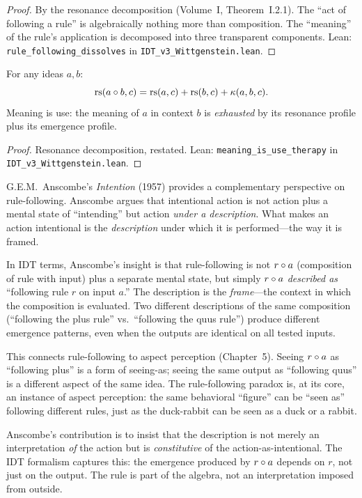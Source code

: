 \begin{proof}
By the resonance decomposition (Volume~I, Theorem~I.2.1). The ``act of
following a rule'' is algebraically nothing more than composition. The
``meaning'' of the rule's application is decomposed into three transparent
components.
Lean: \texttt{rule\_following\_dissolves} in \texttt{IDT\_v3\_Wittgenstein.lean}.
\end{proof}

\begin{theorem}
\label{thm:meaning-use-therapy}
For any ideas $a, b$:
\[
\mathrm{rs}(a \circ b, c) = \mathrm{rs}(a, c) + \mathrm{rs}(b, c) + \kappa(a, b, c).
\]
Meaning is use: the meaning of $a$ in context $b$ is \emph{exhausted} by
its resonance profile plus its emergence profile.
\end{theorem}

\begin{proof}
Resonance decomposition, restated.
Lean: \texttt{meaning\_is\_use\_therapy} in \texttt{IDT\_v3\_Wittgenstein.lean}.
\end{proof}

\begin{interpretation}
G.E.M.~Anscombe's \textit{Intention} (1957) provides a complementary
perspective on rule-following. Anscombe argues that intentional action is
not action plus a mental state of ``intending'' but action \emph{under a
description}. What makes an action intentional is the \emph{description}
under which it is performed---the way it is framed.

In IDT terms, Anscombe's insight is that rule-following is not
$r \circ a$ (composition of rule with input) plus a separate mental
state, but simply $r \circ a$ \emph{described as} ``following rule $r$
on input $a$.'' The description is the \emph{frame}---the context in which
the composition is evaluated. Two different descriptions of the same
composition (``following the plus rule'' vs.\ ``following the quus rule'')
produce different emergence patterns, even when the outputs are identical
on all tested inputs.

This connects rule-following to aspect perception (Chapter~5). Seeing
$r \circ a$ as ``following plus'' is a form of seeing-as; seeing the
same output as ``following quus'' is a different aspect of the same idea.
The rule-following paradox is, at its core, an instance of aspect perception:
the same behavioral ``figure'' can be ``seen as'' following different rules,
just as the duck-rabbit can be seen as a duck or a rabbit.

Anscombe's contribution is to insist that the description is not merely
an interpretation \emph{of} the action but is \emph{constitutive} of the
action-as-intentional. The IDT formalism captures this: the emergence
produced by $r \circ a$ depends on $r$, not just on the output. The
rule is part of the algebra, not an interpretation imposed from outside.
\end{interpretation}

